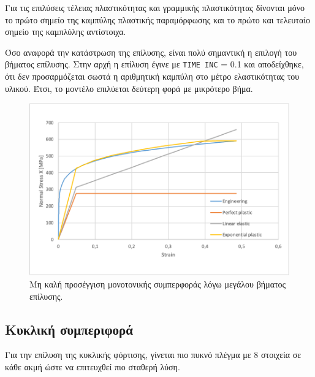\documentclass{article}
\begin{document}
Για τις επιλύσεις τέλειας πλαστικότητας και γραμμικής πλαστικότητας δίνονται μόνο το πρώτο σημείο της καμπύλης πλαστικής παραμόρφωσης και το πρώτο και τελευταίο σημείο της καμπλύλης αντίστοιχα. 
\par Όσο αναφορά την κατάστρωση της επίλυσης, είναι πολύ σημαντική η επιλογή του βήματος επίλυσης. Στην αρχή η επίλυση έγινε με \texttt{TIME INC} = 0.1 και αποδείχθηκε, ότι δεν προσαρμόζεται σωστά η αριθμητική καμπύλη στο μέτρο ελαστικότητας του υλικού. Έτσι, το μοντέλο επιλύεται δεύτερη φορά με μικρότερο βήμα.
\begin{figure}[H]
    \centering
    \includegraphics[width=0.8\linewidth]{media/static-false.png}
    \caption{Μη καλή προσέγγιση μονοτονικής συμπερφοράς λόγω μεγάλου βήματος επίλυσης.}
    \label{fig:statfalse}
\end{figure}

\subsection{Κυκλική συμπεριφορά}
Για την επίλυση της κυκλικής φόρτισης, γίνεται πιο πυκνό πλέγμα με 8 στοιχεία σε κάθε ακμή ώστε να επιτευχθεί πιο σταθερή λύση.

















\listoffigures
\listoftables

\nocite{*}
\printbibliography
\end{document}
